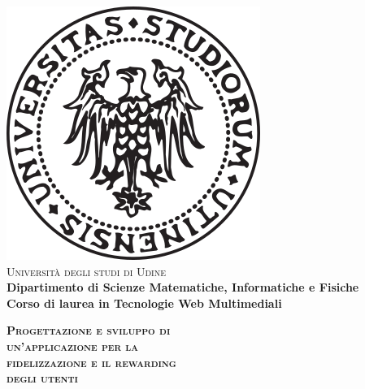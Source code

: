 \begin{titlepage}
\begin{center}
    \includegraphics[scale=0.35]{logo.png}\\
    \vspace{8mm}
    {\huge{\textsc{\textmd{Università degli studi di Udine}}}}\\
    \vspace{10mm}
    {\large{\textbf{ Dipartimento di Scienze Matematiche, Informatiche e Fisiche}}}\\
    \vspace{0.5cm}
    {\large{\textbf{ Corso di laurea in Tecnologie Web Multimediali}}}
\end{center}
\vspace{10mm}
\begin{center}
    {\LARGE\textbf{\textsc{Progettazione e sviluppo di}}}\\
    \vspace{6mm}
    {\LARGE\textbf{\textsc{un'applicazione per la}}}\\
    \vspace{6mm}
    {\LARGE\textbf{\textsc{fidelizzazione e il rewarding}}}\\
    \vspace{6mm}
    {\LARGE\textsc{\textbf{degli utenti}}}\\
    \vspace{10mm}
\end{center}
\vfill
\par
{}
\end{titlepage}
